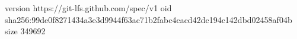 version https://git-lfs.github.com/spec/v1
oid sha256:99de0f8271434a3e3d9944f63ac71b2fabc4cacd42dc194c142dbd02458af04b
size 349692

